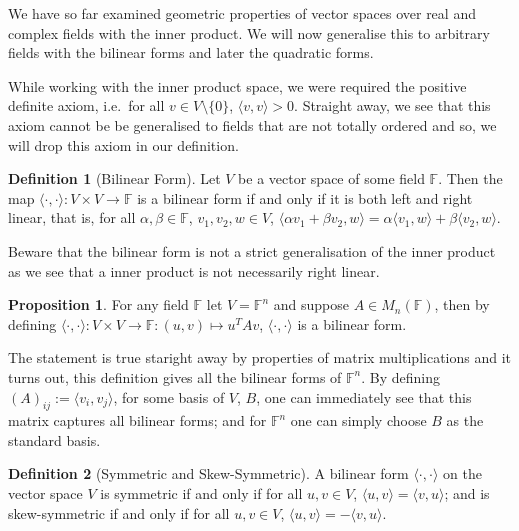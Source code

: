 \documentclass[
]{article}
\theoremstyle{definition}
\newtheorem{prop}{Proposition}[section]
\theoremstyle{definition}
\newtheorem{definition}{Definition}[section]
\begin{document}
We have so far examined geometric properties of vector spaces over real
and complex fields with the inner product. We will now generalise this
to arbitrary fields with the bilinear forms and later the quadratic
forms.

While working with the inner product space, we were required the
positive definite axiom, i.e.~for all \(v \in V \setminus \{0\}\),
\(\langle v, v \rangle > 0\). Straight away, we see that this axiom
cannot be be generalised to fields that are not totally ordered and so,
we will drop this axiom in our definition.

\begin{definition}[Bilinear Form]
  Let \(V\) be a vector space of some field \(\mathbb{F}\). Then the map
  \(\langle \cdot, \cdot \rangle : V \times V \to \mathbb{F}\) is a 
  bilinear form if and only if it is both left and right linear, that is, for all 
  \(\alpha, \beta \in \mathbb{F}\), \(v_1, v_2, w \in V\), 
  \(\langle \alpha v_1 + \beta v_2, w \rangle = \alpha \langle v_1, w \rangle 
    + \beta \langle v_2, w \rangle\).
\end{definition}

Beware that the bilinear form is not a strict generalisation of the
inner product as we see that a inner product is not necessarily right
linear.

\begin{prop}
  For any field \(\mathbb{F}\) let \(V = \mathbb{F}^n\) and suppose 
  \(A \in M_n(\mathbb{F})\), then by defining 
  \(\langle \cdot, \cdot \rangle : V \times V \to \mathbb{F} : 
  (u, v) \mapsto u^T A v\),
  \(\langle \cdot, \cdot \rangle\) is a bilinear form.
\end{prop}

The statement is true staright away by properties of matrix
multiplications and it turns out, this definition gives all the bilinear
forms of \(\mathbb{F}^n\). By defining
\((A)_{ij} := \langle v_i, v_j \rangle\), for some basis of \(V\),
\(B\), one can immediately see that this matrix captures all bilinear
forms; and for \(\mathbb{F}^n\) one can simply choose \(B\) as the
standard basis.

\begin{definition}[Symmetric and Skew-Symmetric]
  A bilinear form \(\langle \cdot, \cdot \rangle\) on the vector space \(V\) 
  is symmetric if and only if for all \(u, v \in V\), 
  \(\langle u, v \rangle = \langle v ,u \rangle\); and is skew-symmetric if 
  and only if for all \(u, v \in V\), \(\langle u, v \rangle = - \langle v, u \rangle\).
\end{definition}
\end{document}
